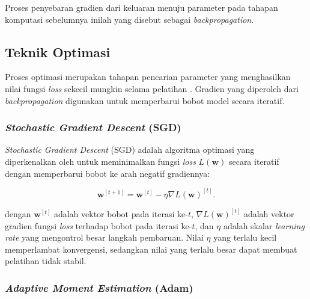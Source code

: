 Proses penyebaran gradien dari keluaran menuju parameter pada tahapan
komputasi sebelumnya inilah yang disebut sebagai
\textit{backpropagation}.


\subsection{Teknik Optimasi}

Proses optimasi merupakan tahapan pencarian parameter yang menghasilkan
nilai fungsi \textit{loss} sekecil mungkin selama pelatihan
\parencite{zhang2023}. Gradien yang diperoleh dari \textit{backpropagation}
digunakan untuk memperbarui bobot model secara iteratif.

\subsubsection{\textit{Stochastic Gradient Descent} (SGD)}

\textit{Stochastic Gradient Descent} (SGD) adalah algoritma optimasi yang
diperkenalkan oleh \parencite{rumelhart1986} untuk meminimalkan fungsi
\textit{loss} $L(\mathbf{w})$ secara iteratif dengan memperbarui bobot
ke arah negatif gradiennya:

\vspace{-1em}
\setlength{\abovedisplayskip}{0pt}
\begin{equation}
    \mathbf{w}^{[t+1]} = \mathbf{w}^{[t]} - \eta \nabla L(\mathbf{w})^{[t]}.
    \label{eq:sgd}
\end{equation}

\noindent dengan $\mathbf{w}^{[t]}$ adalah vektor bobot pada iterasi ke-$t$,
$\nabla L(\mathbf{w})^{[t]}$ adalah vektor gradien fungsi \textit{loss}
terhadap bobot pada iterasi ke-$t$, dan $\eta$ adalah skalar
\textit{learning rate} yang mengontrol besar langkah pembaruan. Nilai
$\eta$ yang terlalu kecil memperlambat konvergensi, sedangkan nilai yang
terlalu besar dapat membuat pelatihan tidak stabil.

\subsubsection{\textit{Adaptive Moment Estimation} (Adam)}

